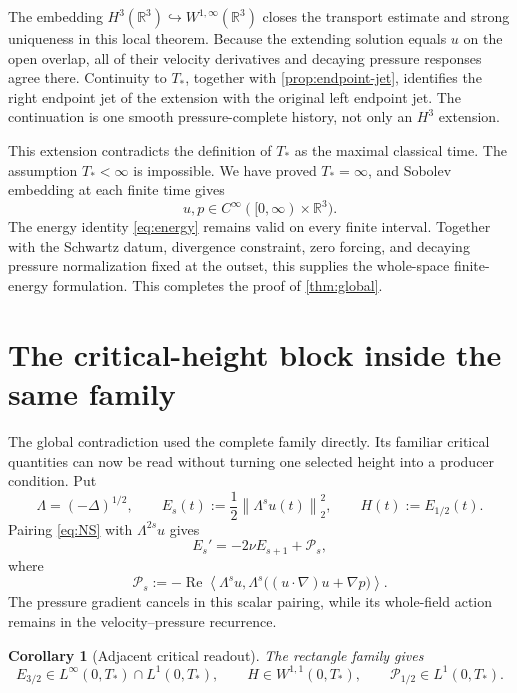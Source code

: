 \documentclass[11pt]{article}
\newtheorem{corollary}[corollary]{Corollary}
\theoremstyle{definition}
\theoremstyle{remark}
\newcommand{\R}{\mathbb R}
\newcommand{\norm}[1]{\left\lVert #1\right\rVert}
\newcommand{\pair}[2]{\left\langle #1,#2\right\rangle}
\begin{document}
The embedding \(H^3(\R^3)\hookrightarrow W^{1,\infty}(\R^3)\) closes the
transport estimate and strong uniqueness in this local theorem.  Because the
extending solution equals \(u\) on the open overlap, all of their velocity
derivatives and decaying pressure responses agree there.  Continuity to
\(T_*\), together with \cref{prop:endpoint-jet}, identifies the right
endpoint jet of the extension with the original left endpoint jet.  The
continuation is one smooth pressure-complete history, not only an \(H^3\)
extension.

This extension contradicts the definition of \(T_*\) as the maximal classical
time.  The assumption \(T_*<\infty\) is impossible.  We have proved
\(T_*=\infty\), and Sobolev embedding at each finite time gives
\[
 u,p\in C^\infty([0,\infty)\times\R^3).
\]
The energy identity \eqref{eq:energy} remains valid on every finite interval.
Together with the Schwartz datum, divergence constraint, zero forcing, and
decaying pressure normalization fixed at the outset, this supplies the
whole-space finite-energy formulation.  This completes the proof of
\cref{thm:global}.

\section{The critical-height block inside the same family}
\label{sec:critical}

The global contradiction used the complete family directly.  Its familiar
critical quantities can now be read without turning one selected height into
a producer condition.  Put
\[
 \Lambda=(-\Delta)^{1/2},
 \qquad
 E_s(t):=\frac12\norm{\Lambda^s u(t)}_2^2,
 \qquad
 H(t):=E_{1/2}(t).
\]
Pairing \eqref{eq:NS} with \(\Lambda^{2s}u\) gives
\begin{equation}
 E_s'=-2\nu E_{s+1}+\mathcal P_s,
 \label{eq:Sobolev-balance}
\end{equation}
where
\begin{equation}
 \mathcal P_s
 :=-\operatorname{Re}\pair{\Lambda^su}
 {\Lambda^s\bigl((u\cdot\nabla)u+\nabla p\bigr)}.
 \label{eq:production}
\end{equation}
The pressure gradient cancels in this scalar pairing, while its whole-field
action remains in the velocity--pressure recurrence.

\begin{corollary}[Adjacent critical readout]
\label{cor:critical}
The rectangle family gives
\begin{equation}
 E_{3/2}\in L^\infty(0,T_*)\cap L^1(0,T_*),
 \qquad
 H\in W^{1,1}(0,T_*),
 \qquad
 \mathcal P_{1/2}\in L^1(0,T_*).
 \label{eq:critical-block}
\end{equation}
\end{corollary}
\end{document}

